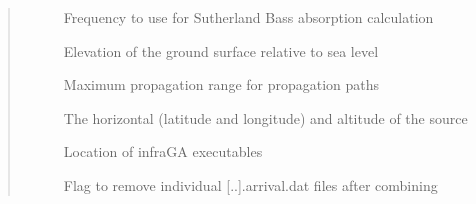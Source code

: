 \documentclass[letterpaper,10pt,english]{sphinxmanual}
\begin{document}
\begin{fulllineitems}
\begin{quote}
\begin{description}
\begin{description}
\item[{}] \leavevmode
Frequency to use for Sutherland Bass absorption calculation

\item[{}] \leavevmode
Elevation of the ground surface relative to sea level

\item[{}] \leavevmode
Maximum propagation range for propagation paths

\item[{}] \leavevmode
The horizontal (latitude and longitude) and altitude of the source

\item[{}] \leavevmode
Location of infraGA executables

\item[{}] \leavevmode
Flag to remove individual {[}..{]}.arrival.dat files after combining

\end{description}

\end{description}\end{quote}

\end{fulllineitems}

\end{document}
